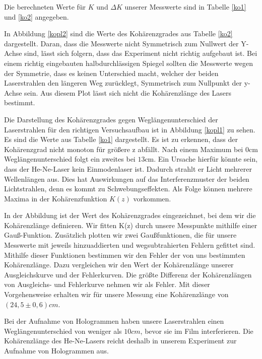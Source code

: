 \documentclass[10pt,a4paper]{article}
\begin{document}
Die berechneten Werte für $K$ und $\Delta K$ unserer Messwerte sind in Tabelle \ref{ko1} und \ref{ko2} angegeben.

In Abbildung \ref{kopl2} sind die Werte des Kohärenzgrades aus Tabelle \ref{ko2} dargestellt. Daran, dass die Messwerte nicht Symmetrisch zum Nullwert der Y-Achse sind, lässt sich folgern, dass das Experiment nicht richtig aufgebaut ist. Bei einem richtig eingebauten halbdurchlässigen Spiegel sollten die Messwerte wegen der Symmetrie, dass es keinen Unterschied macht, welcher der beiden Laserstrahlen den längeren Weg zurücklegt, Symmetrisch zum Nullpunkt der y-Achse sein. Aus diesem Plot lässt sich nicht die Kohärenzlänge des Lasers bestimmt.

Die Darstellung des Kohärenzgrades gegen Weglängenunterschied der Laserstrahlen für den richtigen Versuchsaufbau ist in Abbildung \ref{kopl1} zu sehen. Es sind die Werte aus Tabelle \ref{ko1} dargestellt. Es ist zu erkennen, dass der Kohärenzgrad nicht monoton für größere z abfällt. Nach einem Maximum bei $0$cm Weglängenunterschied folgt ein zweites bei $13$cm. Ein Ursache hierfür könnte sein, dass der He-Ne-Laser kein Einmodenlaser ist. Dadurch strahlt er Licht mehrerer Wellenlängen aus. Dies hat Auswirkungen auf das Interferenzmuster der beiden Lichtstrahlen, denn es kommt zu Schwebungseffekten. Als Folge können mehrere Maxima in der Kohärenzfunktion $K(z)$ vorkommen.

In der Abbildung ist der Wert des Kohärenzgrades eingezeichnet, bei dem wir die Kohärenzlänge definieren. Wir fitten K(z) durch unsere Messpunkte mithilfe einer Gauß-Funktion. Zusätzlich plotten wir zwei Gaußfunktionen, die für unsere Messwerte mit jeweils hinzuaddierten und wegsubtrahierten Fehlern gefittet sind. Mithilfe dieser Funktionen bestimmen wir den Fehler der von uns bestimmten Kohärenzlänge. Dazu vergleichen wir den Wert der Kohärenzlänge unserer Ausgleichskurve und der Fehlerkurven. Die größte Differenz der Kohärenzlängen von Ausgleichs- und Fehlerkurve nehmen wir als Fehler. Mit dieser Vorgehensweise erhalten wir für unsere Messung eine Kohärenzlänge von $(24,5 \pm 0,6)cm$.

Bei der Aufnahme von Hologrammen haben unsere Laserstrahlen einen Weglängenunterschied von weniger als $10cm$, bevor sie im Film interferieren. Die Kohärenzlänge des He-Ne-Lasers reicht deshalb in unserem Experiment zur Aufnahme von Hologrammen aus.
\end{document}
